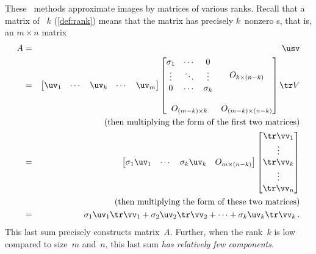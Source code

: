 These \svd\ methods approximate images by matrices of various ranks.
Recall that a matrix of ~\(k\) (\cref{def:rank}) means that the matrix has precisely \(k\)~nonzero s, that is, an \(m\times n\) matrix
\begin{eqnarray*}
A&=&\usv
\\&=&
\begin{bmatrix} \uv_1&\cdots&\uv_k&\cdots&\uv_m \end{bmatrix}
\begin{bmatrix} \begin{matrix} \sigma_1&\cdots&0\\
\vdots&\ddots&\vdots\\
0&\cdots&\sigma_k \end{matrix} & 
O_{k\times (n-k)}\\\,\\
O_{(m-k)\times k}&O_{(m-k)\times (n-k)}\end{bmatrix}
\tr V
\\&&(\text{then multiplying the form of the first two matrices})
\\&=&
\begin{bmatrix} \sigma_1\uv_1&\cdots&\sigma_k\uv_k&O_{m\times(n-k)} \end{bmatrix}
\begin{bmatrix} \tr\vv_1\\\vdots\\\tr\vv_k\\\vdots\\\tr\vv_n \end{bmatrix}
\\&&(\text{then multiplying the form of these two matrices})
\\&=&
\sigma_1\uv_1\tr\vv_1+\sigma_2\uv_2\tr\vv_2+\cdots+\sigma_k\uv_k\tr\vv_k\,.
\end{eqnarray*}
This last sum precisely constructs matrix~\(A\).
Further, when the rank~\(k\) is low compared to size~\(m\) and~\(n\), this last sum \emph{has relatively few components}.




